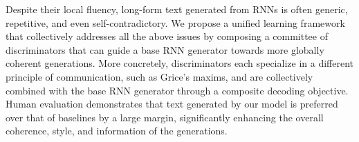 Despite their local fluency, long-form text generated from RNNs is often generic, repetitive, and even self-contradictory. We propose a unified learning framework that collectively addresses all the above issues by composing a committee of discriminators that can guide a base RNN generator towards more globally coherent generations. More concretely, discriminators each specialize in a different principle of communication, such as Grice's maxims, and are collectively combined with the base RNN generator through a composite decoding objective. Human evaluation demonstrates that text generated by our model is preferred over that of baselines by a large margin, significantly enhancing the overall coherence, style, and information of the generations.
